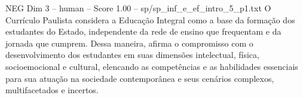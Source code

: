 \begin{textsample}{NEG Dim 3 – human – Score 1.00 – sp/sp\_inf\_e\_ef\_intro\_5\_p1.txt}  \label{ex:f3_neg_017}
O Currículo Paulista considera a Educação Integral como a base da formação dos estudantes do Estado, independente da rede de ensino que frequentam e da jornada que cumprem.
Dessa maneira, afirma o compromisso com o desenvolvimento dos estudantes em suas dimensões intelectual, física, socioemocional e cultural, elencando as competências e as habilidades essenciais para sua atuação na sociedade contemporânea e seus cenários complexos, multifacetados e incertos.

\end{textsample}
